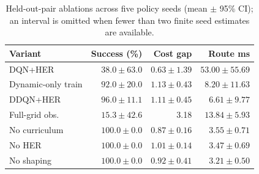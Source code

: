 \begin{table}[H]
\centering
\caption{Held-out-pair ablations across five policy seeds (mean $\pm$ 95\% CI); an interval is omitted when fewer than two finite seed estimates are available.}
\scriptsize
\setlength{\tabcolsep}{2.7pt}
\begin{tabular}{lrrr}
\toprule
Variant & Success (\%) & Cost gap & Route ms \\
\midrule
DQN+HER & $38.0 \pm 63.0$ & $0.63 \pm 1.39$ & $53.00 \pm 55.69$ \\
Dynamic-only train & $92.0 \pm 20.0$ & $1.13 \pm 0.43$ & $8.20 \pm 11.63$ \\
DDQN+HER & $96.0 \pm 11.1$ & $1.11 \pm 0.45$ & $6.61 \pm 9.77$ \\
Full-grid obs. & $15.3 \pm 42.6$ & 3.18 & $13.84 \pm 5.93$ \\
No curriculum & $100.0 \pm 0.0$ & $0.87 \pm 0.16$ & $3.55 \pm 0.71$ \\
No HER & $100.0 \pm 0.0$ & $1.01 \pm 0.14$ & $3.47 \pm 0.69$ \\
No shaping & $100.0 \pm 0.0$ & $0.92 \pm 0.41$ & $3.21 \pm 0.50$ \\
\bottomrule
\end{tabular}
\label{tab:ablation-results}
\end{table}
